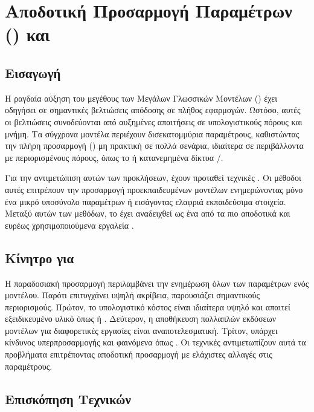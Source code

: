 \section{Αποδοτική Προσαρμογή Παραμέτρων () και }

\subsection{Εισαγωγή}

Η ραγδαία αύξηση του μεγέθους των Μεγάλων Γλωσσικών Μοντέλων () έχει οδηγήσει σε σημαντικές βελτιώσεις απόδοσης σε πλήθος εφαρμογών. Ωστόσο, αυτές οι βελτιώσεις συνοδεύονται από αυξημένες απαιτήσεις σε υπολογιστικούς πόρους και μνήμη. Τα σύγχρονα μοντέλα περιέχουν δισεκατομμύρια παραμέτρους, καθιστώντας την πλήρη προσαρμογή () μη πρακτική σε πολλά σενάρια, ιδιαίτερα σε περιβάλλοντα με περιορισμένους πόρους, όπως το  ή κατανεμημένα δίκτυα /.

Για την αντιμετώπιση αυτών των προκλήσεων, έχουν προταθεί τεχνικές . Οι μέθοδοι αυτές επιτρέπουν την προσαρμογή προεκπαιδευμένων μοντέλων ενημερώνοντας μόνο ένα μικρό υποσύνολο παραμέτρων ή εισάγοντας ελαφριά εκπαιδεύσιμα στοιχεία. Μεταξύ αυτών των μεθόδων, το  έχει αναδειχθεί ως ένα από τα πιο αποδοτικά και ευρέως χρησιμοποιούμενα εργαλεία \cite{hu2021lora}.

\subsection{Κίνητρο για }

Η παραδοσιακή προσαρμογή περιλαμβάνει την ενημέρωση όλων των παραμέτρων ενός μοντέλου. Παρότι επιτυγχάνει υψηλή ακρίβεια, παρουσιάζει σημαντικούς περιορισμούς. Πρώτον, το υπολογιστικό κόστος είναι ιδιαίτερα υψηλό και απαιτεί εξειδικευμένο υλικό όπως  ή . Δεύτερον, η αποθήκευση πολλαπλών εκδόσεων μοντέλων για διαφορετικές εργασίες είναι αναποτελεσματική. Τρίτον, υπάρχει κίνδυνος υπερπροσαρμογής και φαινόμενα όπως  \cite{raffel2020exploring}. Οι τεχνικές  αντιμετωπίζουν αυτά τα προβλήματα επιτρέποντας αποδοτική προσαρμογή με ελάχιστες αλλαγές στις παραμέτρους.

\subsection{Επισκόπηση Τεχνικών }

